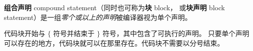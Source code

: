 \documentclass[../../LearnCpp.tex]{subfiles}
\begin{document}

\textbf{组合声明} compound statement（同时也可称为\textbf{块} block，
或\textbf{块声明} block statement）是一组\textit{零个或以上的声明}被编译器视为单个声明。

代码块开始与 $\{$ 符号并结束于 $\}$ 符号，其中包含了可执行的声明。
只要单个声明可以存在的地方，代码块就可以在那里存在。代码块不需要以分号结束。
\end{document}
